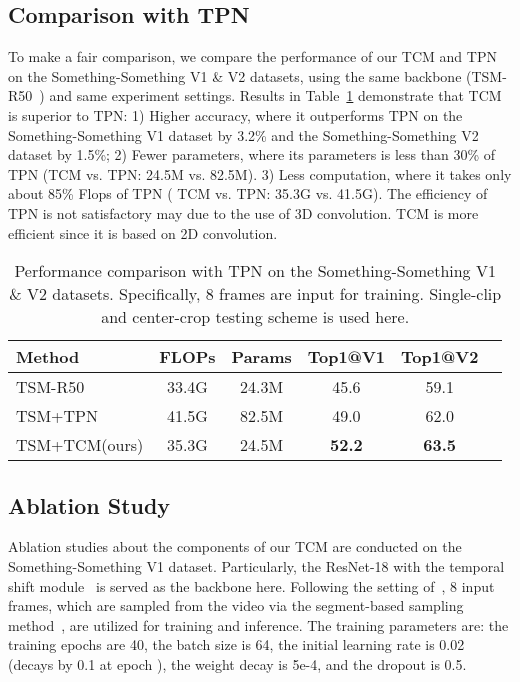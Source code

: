 \documentclass[journal]{IEEEtran}
\begin{document}
\subsection{Comparison with TPN}
To make a fair comparison, we compare the performance of our TCM and TPN~\cite{yang2020temporal} on the Something-Something V1 \& V2 datasets, using the same backbone (TSM-R50~\cite{lin2019tsm}) and same experiment settings. Results in Table~\ref{tab:tpn_tcm} demonstrate that TCM is superior to TPN: 1) Higher accuracy, where it outperforms TPN on the Something-Something V1 dataset by 3.2\% and the Something-Something V2 dataset by 1.5\%; 2) Fewer parameters, where its parameters is less than 30\% of TPN (TCM vs. TPN: 24.5M vs. 82.5M). 3) Less computation, where it takes only about 85\% Flops of TPN ( TCM vs. TPN: 35.3G vs. 41.5G). The efficiency of TPN is not satisfactory may due to the use of 3D convolution. TCM is more efficient since it is based on 2D convolution.

\begin{table}
\caption{Performance comparison with TPN on the Something-Something V1 \& V2 datasets. Specifically, 8 frames are input for training. Single-clip and
center-crop testing scheme is used here.}
\label{tab:tpn_tcm}
\centering
\begin{tabular}{|l|c|c|c|c|c}
\hline
Method                         & FLOPs      & Params & Top1@V1 &  Top1@V2 \\ \hline
TSM-R50~\cite{lin2019tsm}        & 33.4G   & 24.3M   & 45.6  & 59.1            \\ \hline
TSM+TPN~\cite{yang2020temporal}    & 41.5G   & 82.5M     & 49.0      & 62.0    \\ \hline
TSM+TCM(ours)    &     35.3G     &   24.5M    & \textbf{52.2}       & \textbf{63.5}      \\ \hline
\end{tabular}
\end{table}

\subsection{Ablation Study}
Ablation studies about the components of our TCM are conducted on the Something-Something V1 dataset. Particularly, the ResNet-18 with the temporal shift module~\cite{lin2019tsm} is served as the backbone here. Following the setting of~\cite{lin2019tsm}, 8 input frames, which are sampled from the video via the segment-based sampling method~\cite{wang2016temporal}, are utilized for training and inference. The training parameters are: the training epochs are 40, the batch size is 64, the initial learning rate is 0.02 (decays by 0.1 at epoch ), the weight decay is 5e-4, and the dropout is 0.5.
\end{document}
